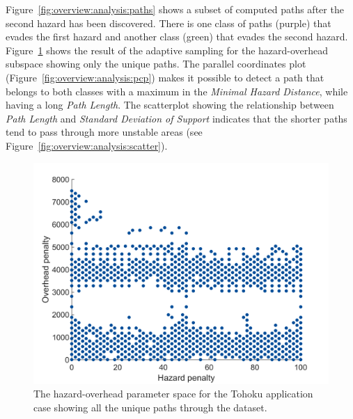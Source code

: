 \documentclass{egpubl}
\begin{document}
Figure~\ref{fig:overview:analysis:paths} shows a subset of computed paths after the second hazard has been discovered. There is one class of paths (purple) that evades the first hazard and another class (green) that evades the second hazard. Figure~\ref{fig:sampling:tohoku} shows the result of the adaptive sampling for the hazard-overhead subspace showing only the unique paths. The parallel coordinates plot (Figure~\ref{fig:overview:analysis:pcp}) makes it possible to detect a path that belongs to both classes with a maximum in the \emph{Minimal Hazard Distance}, while having a long \emph{Path Length}. The scatterplot showing the relationship between \emph{Path Length} and \emph{Standard Deviation of Support} indicates that the shorter paths tend to pass through more unstable areas (see Figure~\ref{fig:overview:analysis:scatter}).

\begin{figure}
	\newcommand{\abImageComparisonWidth}{\linewidth}
	\centering
		\includegraphics[width=\abImageComparisonWidth]{figures/adaptive_sampling_tohoku.png}
	\caption{The hazard-overhead parameter space for the Tohoku application case showing all the unique paths through the dataset.}
	\label{fig:sampling:tohoku}
\end{figure}

\end{document}
